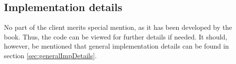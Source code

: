 \documentclass[Main]{subfiles}
\begin{document}
\subsection{Implementation details}
No part of the client merits special mention, as it has been developed by the book. 
Thus, the code can be viewed for further details if needed.
It should, however, be mentioned that general implementation details can be found in section \ref{sec:generalImpDetails}.
\end{document}
